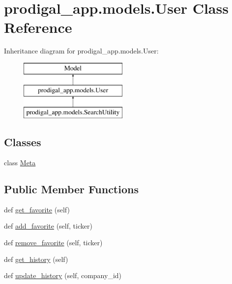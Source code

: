\hypertarget{classprodigal__app_1_1models_1_1_user}{}\section{prodigal\+\_\+app.\+models.\+User Class Reference}
\label{classprodigal__app_1_1models_1_1_user}
Inheritance diagram for prodigal\+\_\+app.\+models.\+User\+:\begin{figure}[H]
\begin{center}
\leavevmode
\includegraphics[height=3.000000cm]{classprodigal__app_1_1models_1_1_user}
\end{center}
\end{figure}
\subsection*{Classes}
\begin{DoxyCompactItemize}
\item 
class \mbox{\hyperlink{classprodigal__app_1_1models_1_1_user_1_1_meta}{Meta}}
\end{DoxyCompactItemize}
\subsection*{Public Member Functions}
\begin{DoxyCompactItemize}
\item 
def \mbox{\hyperlink{classprodigal__app_1_1models_1_1_user_a038a551bcb0acf31766988d13bc69cb3}{get\+\_\+favorite}} (self)
\item 
def \mbox{\hyperlink{classprodigal__app_1_1models_1_1_user_a4b0cfd019e0e5022636cd5c41bc7a024}{add\+\_\+favorite}} (self, ticker)
\item 
def \mbox{\hyperlink{classprodigal__app_1_1models_1_1_user_a95cf60a8cd82bf3017d8533e621dc5c2}{remove\+\_\+favorite}} (self, ticker)
\item 
def \mbox{\hyperlink{classprodigal__app_1_1models_1_1_user_a88065516192ed34c32a3222ea3812a1c}{get\+\_\+history}} (self)
\item 
def \mbox{\hyperlink{classprodigal__app_1_1models_1_1_user_a0d87aad2f6a30ac3d3aa95b4132c93ae}{update\+\_\+history}} (self, company\+\_\+id)
\end{DoxyCompactItemize}

